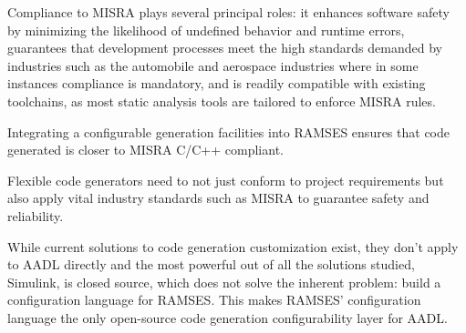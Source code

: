 Compliance to \gls{MISRA} plays several principal roles: it enhances software safety by minimizing the likelihood of undefined behavior and runtime errors, guarantees that development processes meet the high standards demanded by industries such as the automobile and aerospace industries where in some instances compliance is mandatory, and is readily compatible with existing toolchains, as most static analysis tools are tailored to enforce \gls{MISRA} rules.

Integrating a configurable generation facilities into \gls{RAMSES} ensures that code generated is closer to \gls{MISRA} C/C++ compliant.

\begin{tcolorbox}[colback=green!5, colframe=green!40!black] 
	Flexible code generators need to not just conform to project requirements but also apply vital industry standards such as \gls{MISRA} to guarantee safety and reliability. 
\end{tcolorbox}


While current solutions to code generation customization exist, they don't apply to \gls{AADL} directly and the most powerful out of all the solutions studied, Simulink, is closed source, which does not solve the inherent problem: build a configuration language for \gls{RAMSES}. This makes \gls{RAMSES}' configuration language the only open-source code generation configurability layer for \gls{AADL}. %





